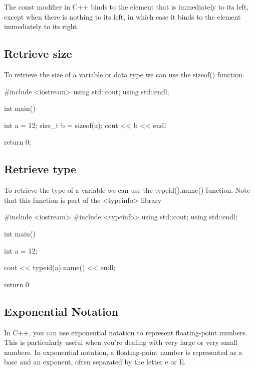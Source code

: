 \documentclass{report}
\begin{document}
    \bigbreak \noindent 
    The const modifier in C++ binds to the element that is immediately to its left, except when there is nothing to its left, in which case it binds to the element immediately to its right.
    \bigbreak \noindent 


    \pagebreak \bigbreak \noindent 
    \subsection{Retrieve size}
    \bigbreak \noindent 
    To retrieve the size of a variable or data type we can use the sizeof() function.
    \bigbreak \noindent 
    
    \begin{cppcode}
#include <iostream>
using std::cout;
using std::endl;

int main() {
    int a = 12;
    size_t b = sizeof(a);
    cout << b << endl

    return 0;
}
    \end{cppcode}
    
    \bigbreak \noindent 

    \bigbreak \noindent \bigbreak \noindent 
    \subsection{Retrieve type}
    \bigbreak \noindent 
    To retrieve the type of a variable we can use the typeid().name() function. Note that this function is part of the <typeinfo> library
    \bigbreak \noindent 
    
    \begin{cppcode}
#include <iostream>
#include <typeinfo>
using std::cout;
using std::endl;

int main(){

    int a = 12;

    cout << typeid(a).name() << endl;

    return 0
}
    \end{cppcode}
    
    \pagebreak \bigbreak \noindent 
    \subsection{Exponential Notation}
    \bigbreak \noindent 
    In C++, you can use exponential notation to represent floating-point numbers. This is particularly useful when you're dealing with very large or very small numbers. In exponential notation, a floating-point number is represented as a base and an exponent, often separated by the letter e or E.
    \bigbreak \noindent 
    
\end{document}
